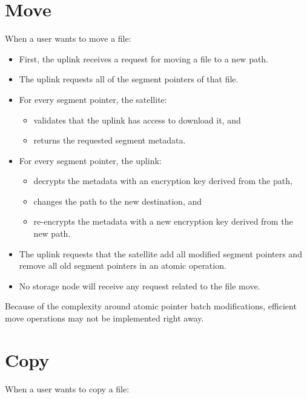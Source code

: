 \documentclass[11pt,fleqn,openany]{book}
\begin{document}
\section{Move}

When a user wants to move a file:

\begin{itemize}
\item First, the uplink receives a request for moving a file to a new path.
\item The uplink requests all of the segment pointers of that file.
\item For every segment pointer, the satellite:
  \begin{itemize}
  \item validates that the uplink has access to download it, and
  \item returns the requested segment metadata.
  \end{itemize}
\item For every segment pointer, the uplink:
  \begin{itemize}
  \item decrypts the metadata with an encryption key derived from the path,
  \item changes the path to the new destination, and
  \item re-encrypts the metadata with a new encryption key derived from the
    new path.
  \end{itemize}
\item The uplink requests that the satellite add
  all modified segment pointers and remove all old segment pointers in an
  atomic operation.
\item No storage node will receive any request related to the file move.
\end{itemize}

Because of the complexity around atomic pointer batch modifications, efficient
move operations may not be implemented right away.

\section{Copy}

When a user wants to copy a file:
\end{document}

